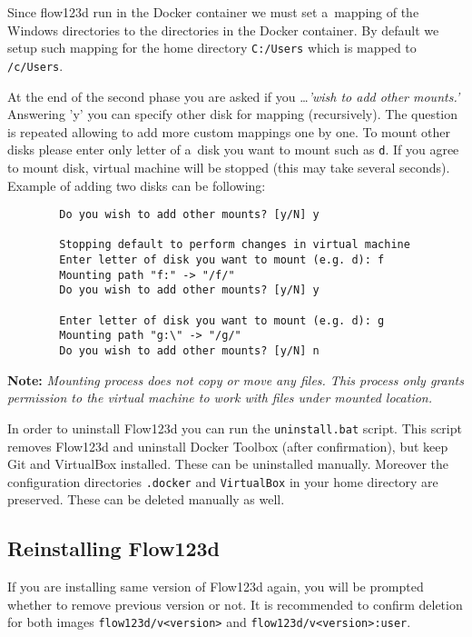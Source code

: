 \documentclass[12pt,a4paper]{report}
\begin{document}
\begin{enumerate}
	Since flow123d run in the Docker container we must set a~mapping of the Windows directories to the directories in the Docker container. 
	By default we setup such mapping for the home directory \verb'C:/Users' which is mapped to \verb'/c/Users'. 
	
	At the end of the second phase you are asked if you \dots \emph{'wish to add other mounts.'} Answering 'y' you can specify other disk for mapping 
	(recursively). The question is repeated allowing to add more custom mappings one by one. To mount other disks please enter only letter 
	of a~disk you want to mount such as \verb'd'.
	If you agree to mount disk, virtual machine will be stopped 
	(this may take several seconds). Example of adding two disks can be following:
	\begin{verbatim}
		Do you wish to add other mounts? [y/N] y
		
		Stopping default to perform changes in virtual machine
		Enter letter of disk you want to mount (e.g. d): f
		Mounting path "f:" -> "/f/"
		Do you wish to add other mounts? [y/N] y
		
		Enter letter of disk you want to mount (e.g. d): g
		Mounting path "g:\" -> "/g/"
		Do you wish to add other mounts? [y/N] n
	\end{verbatim}
	
	\textbf{Note:}
	\textit{Mounting process does not copy or move any files. This process only grants permission to the virtual machine to work with files under mounted location.}
\end{enumerate}

In order to uninstall Flow123d you can run the \verb'uninstall.bat' script. This script removes Flow123d 
and uninstall Docker Toolbox (after confirmation), but keep Git and VirtualBox installed. These can be uninstalled manually. 
Moreover the configuration directories \verb'.docker' and \verb'VirtualBox' in your home directory are preserved. These can be deleted manually as well. 




\subsection{Reinstalling Flow123d}
\label{duplicit-image}
If you are installing same version of Flow123d again, you will be prompted whether to remove previous version or not. 
It is recommended to confirm deletion for both images \verb'flow123d/v<version>' and \verb'flow123d/v<version>:user'.
\end{document}
